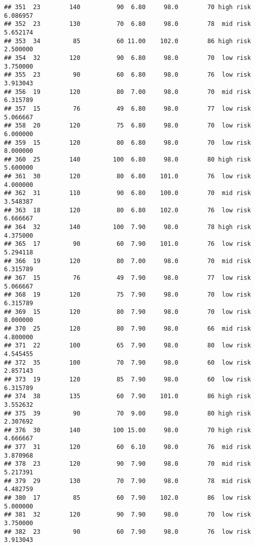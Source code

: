 \documentclass[
  ignorenonframetext,
]{beamer}
\begin{document}
\begin{frame}[fragile]
\begin{verbatim}
## 351  23        140          90  6.80     98.0        70 high risk      6.086957
## 352  23        130          70  6.80     98.0        78  mid risk      5.652174
## 353  34         85          60 11.00    102.0        86 high risk      2.500000
## 354  32        120          90  6.80     98.0        70  low risk      3.750000
## 355  23         90          60  6.80     98.0        76  low risk      3.913043
## 356  19        120          80  7.00     98.0        70  mid risk      6.315789
## 357  15         76          49  6.80     98.0        77  low risk      5.066667
## 358  20        120          75  6.80     98.0        70  low risk      6.000000
## 359  15        120          80  6.80     98.0        70  low risk      8.000000
## 360  25        140         100  6.80     98.0        80 high risk      5.600000
## 361  30        120          80  6.80    101.0        76  low risk      4.000000
## 362  31        110          90  6.80    100.0        70  mid risk      3.548387
## 363  18        120          80  6.80    102.0        76  low risk      6.666667
## 364  32        140         100  7.90     98.0        78 high risk      4.375000
## 365  17         90          60  7.90    101.0        76  low risk      5.294118
## 366  19        120          80  7.00     98.0        70  mid risk      6.315789
## 367  15         76          49  7.90     98.0        77  low risk      5.066667
## 368  19        120          75  7.90     98.0        70  low risk      6.315789
## 369  15        120          80  7.90     98.0        70  low risk      8.000000
## 370  25        120          80  7.90     98.0        66  mid risk      4.800000
## 371  22        100          65  7.90     98.0        80  low risk      4.545455
## 372  35        100          70  7.90     98.0        60  low risk      2.857143
## 373  19        120          85  7.90     98.0        60  low risk      6.315789
## 374  38        135          60  7.90    101.0        86 high risk      3.552632
## 375  39         90          70  9.00     98.0        80 high risk      2.307692
## 376  30        140         100 15.00     98.0        70 high risk      4.666667
## 377  31        120          60  6.10     98.0        76  mid risk      3.870968
## 378  23        120          90  7.90     98.0        70  mid risk      5.217391
## 379  29        130          70  7.90     98.0        78  mid risk      4.482759
## 380  17         85          60  7.90    102.0        86  low risk      5.000000
## 381  32        120          90  7.90     98.0        70  low risk      3.750000
## 382  23         90          60  7.90     98.0        76  low risk      3.913043

\end{verbatim}
\end{frame}
\end{document}
